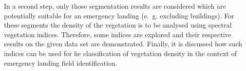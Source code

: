In a second step, only those segmentation results are considered which are potentially suitable for an emergency landing (e.~g. excluding buildings). For these segments the density of the vegetation is to be analysed using spectral vegetation indices. Therefore, some indices are explored and their respective results on the given data set are demonstrated. Finally, it is discussed how such indices can be used for he classification of vegetation density in the context of emergency landing field identification.

\newpage